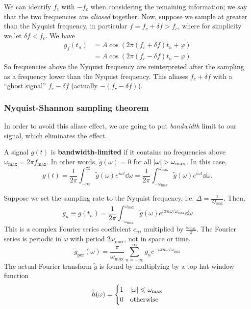 \documentclass[a4paper]{article}
\begin{document}
We can identify \( f_c \) with \( -f_c \) when considering the remaining information; we say that the two frequencies are \textit{aliased} together.
Now, suppose we sample at greater than the Nyquist frequency, in particular \( f = f_c + \delta f > f_c \), where for simplicity we let \( \delta f < f_c \).
We have
\begin{align*}
	g_f(t_n) & = A \cos(2\pi (f_c + \delta f)t_n + \varphi) \\
	         & = A \cos(2\pi (f_c - \delta f)t_n - \varphi)
\end{align*}
So frequencies above the Nyquist frequency are reinterpreted after the sampling as a frequency lower than the Nyquist frequency.
This aliases \( f_c + \delta f \) with a ``ghost signal'' \( f_c - \delta f \) (actually $ -(f_c-\delta f) $).

\subsubsection{Nyquist-Shannon sampling theorem}
In order to avoid this aliase effect, we are going to put \textit{bandwidth} limit to our signal, which eliminates the effect. 
\begin{definition}
	A signal \( g(t) \) is \textbf{bandwidth-limited} if it contains no frequencies above \( \omega_{\max} = 2\pi f_{\max} \).
	In other words, \( \widetilde g(\omega) = 0 \) for all \( \abs{\omega} > \omega_{\max} \).
	In this case,
	\[
		g(t) = \frac{1}{2\pi} \int_{-\infty}^\infty \widetilde g(\omega) e^{i\omega t} \dd{\omega} = \frac{1}{2\pi} \int_{-\omega_{\max}}^{\omega_{\max}} \widetilde g(\omega) e^{i\omega t} \dd{\omega}.
	\]
\end{definition}
\noindent Suppose we set the sampling rate to the Nyquist frequency, i.e. \( \Delta = \frac{1}{2f_{\max}} \).
Then,
\[
	g_n \equiv g(t_n) = \frac{1}{2\pi} \int_{-\omega_{\max}}^{\omega_{\max}} \widetilde g(\omega) e^{i\pi n \omega / \omega_{\max}} \dd{\omega}
\]
This is a complex Fourier series coefficient \( c_n \), multiplied by \( \frac{\omega_{\max}}{\pi} \).
The Fourier series is periodic in \( \omega \) with period \( 2 \omega_{\max} \), not in space or time.
\[
	\widetilde g_\mathrm{per}(\omega) = \frac{\pi}{\omega_{\max}} \sum_{n=-\infty}^\infty g_n e^{-i \pi n \omega / \omega_{\max}}
\]
The actual Fourier transform \( \widetilde g \) is found by multiplying by a top hat window function
\[
	\widetilde h(\omega) = \begin{cases}
		1 & \abs{\omega} \leqslant \omega_{\max} \\
		0 & \text{otherwise}
	\end{cases}
\]
\end{document}
